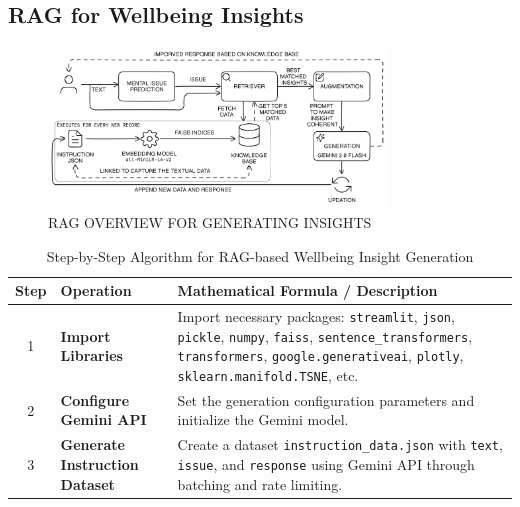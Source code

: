 \subsection{RAG for Wellbeing Insights}

\begin{figure}[H]  
    \centering
    \includegraphics[width=0.8\textwidth]{Images/RAG_FLOW.png}  
    \caption*{RAG OVERVIEW FOR GENERATING INSIGHTS}
    \label{01i}  %
\end{figure}

\begin{table}[H]
    \centering
    \caption*{Step-by-Step Algorithm for RAG-based Wellbeing Insight Generation}
    \label{tab:algorithm}
    \begin{tabularx}{\textwidth}{|c|p{3cm}|X|}
        \hline
        \textbf{Step} & \textbf{Operation} & \textbf{Mathematical Formula / Description} \\ \hline
        1 & \textbf{Import Libraries} & Import necessary packages: \texttt{streamlit}, \texttt{json}, \texttt{pickle}, \texttt{numpy}, \texttt{faiss}, \texttt{sentence\_transformers}, \texttt{transformers}, \texttt{google.generativeai}, \texttt{plotly}, \texttt{sklearn.manifold.TSNE}, etc. \\ \hline
        2 & \textbf{Configure Gemini API} & Set the generation configuration parameters and initialize the Gemini model. \\ \hline
        3 & \textbf{Generate Instruction Dataset} & Create a dataset \texttt{instruction\_data.json} with \texttt{text}, \texttt{issue}, and \texttt{response} using Gemini API through batching and rate limiting. \\ \hline
    \end{tabularx}
\end{table}

\pagebreak

